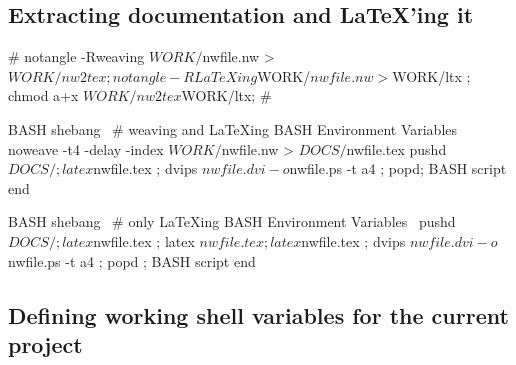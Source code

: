 \documentclass[11pt]{article}
\def\nwendcode{\endtrivlist \endgroup} %
\let\nwdocspar=\par                    %
\newcommand{\subsctn}[1]{\subsection{#1}}
\begin{document}
\subsctn{Extracting documentation and \LaTeX{}'ing it} %

\nwenddocs{}\plusendmoddef
#
notangle -Rweaving  $WORK/$nwfile.nw > $WORK/nw2tex ;
notangle -RLaTeXing $WORK/$nwfile.nw > $WORK/ltx ;
chmod a+x $WORK/nw2tex $WORK/ltx;
#
\nwendcode{}\nwdocspar

\nwenddocs{}\endmoddef
\LA{}BASH shebang~{\nwtagstyle{}}\RA{}
# weaving and LaTeXing
\LA{}BASH Environment Variables~{\nwtagstyle{}}\RA{}
noweave -t4 -delay -index $WORK/$nwfile.nw > $DOCS/$nwfile.tex 
pushd $DOCS/ ;
latex $nwfile.tex ;
dvips $nwfile.dvi -o $nwfile.ps -t a4 ;
popd;
\LA{}BASH script end~{\nwtagstyle{}}\RA{}
\nwendcode{}\nwdocspar

\nwenddocs{}\endmoddef
\LA{}BASH shebang~{\nwtagstyle{}}\RA{}
# only LaTeXing
\LA{}BASH Environment Variables~{\nwtagstyle{}}\RA{}
pushd $DOCS/ ;
latex $nwfile.tex ; 
latex $nwfile.tex ; 
latex $nwfile.tex ;
dvips $nwfile.dvi -o $nwfile.ps -t a4 ;
popd ;
\LA{}BASH script end~{\nwtagstyle{}}\RA{}
\nwendcode{}%

\subsctn{Defining working shell variables for the current project} %
\end{document}
